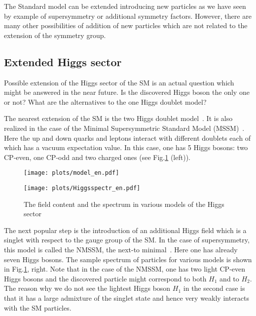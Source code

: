 \documentclass{cernyrep}
\begin{document}
The Standard model can be extended introducing new particles as we have seen by example of supersymmetry or additional symmetry factors. However, there are many other possibilities of addition of new particles which are not related to the extension of the symmetry group.

\subsection{Extended Higgs sector}

Possible extension of the Higgs sector of the SM is an actual question which might be answered in the near future. Is the discovered Higgs boson the only one or not? What are the alternatives  to the one Higgs doublet model?  

The nearest extension of the SM is the two Higgs doublet model~\cite{THDM}. It is also realized in the case of the Minimal Supersymmetric Standard Model (MSSM)~\cite{MSSM}.  Here the up and down quarks and leptons interact with different doublets  each of which has a vacuum expectation value. In this case, one has 5 Higgs bosons:  two CP-even, one CP-odd and two charged ones (see Fig.\ref{spectr} (left)). 
\begin{figure}[htb]\vspace{0.6cm}
\leavevmode \hspace{1cm}
\texttt{[image: plots/model\_en.pdf]} \vspace{-5.6cm}

\hspace{8.4cm}\texttt{[image: plots/Higgsspectr\_en.pdf]}
\caption{The field content and the spectrum in various models of the Higgs sector}
\label{spectr}
\end{figure}

The next popular step is the introduction of an additional Higgs field which is a singlet with respect to the gauge group of the SM. In the case of supersymmetry, this model is called the NMSSM, the next-to minimal~\cite{NMSSM}.  Here one has already seven Higgs bosons. The sample spectrum of particles for various models is shown in Fig.\ref{spectr}, right. Note that in the case of the NMSSM, one has two light CP-even Higgs  bosons and the discovered particle might correspond to both $H_1$ and to  $H_2$. The reason why we do not see the lightest Higgs boson $H_1$ in the second case is that it has a large admixture of the singlet state and hence very weakly interacts with the SM particles.
\end{document}
